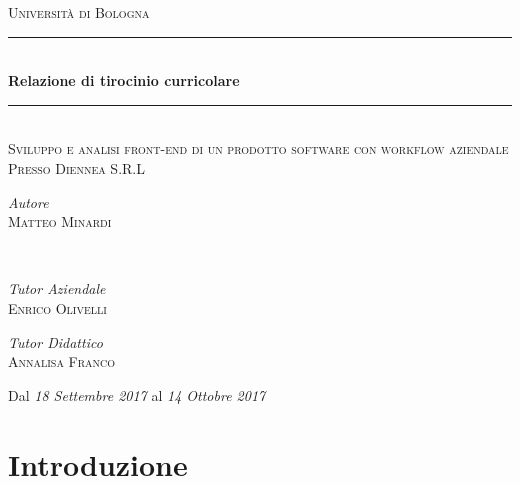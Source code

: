 \documentclass[a4paper]{article}
\begin{document}
\begin{titlepage}
	\newcommand{\HRule}{\rule{\linewidth}{0.1 mm}}
	\center
	\textsc{\LARGE Università di Bologna}\\[1.5cm] %
	
	\HRule\\[0.8 cm]
	{\huge\bfseries Relazione di tirocinio curricolare}\\[0.4cm] %
  \HRule\\[1.5cm]
  
	\textsc{\Large Sviluppo e analisi front-end di un prodotto software con workflow
	aziendale}\\[0.3cm] %
	\textsc{\large Presso Diennea S.R.L}\\[1.5cm] %
	
	
	\begin{minipage}{0.4\textwidth}
		\begin{flushleft}
			\large
			\textit{Autore}\\
			\textsc{Matteo Minardi}
		\end{flushleft}
	\end{minipage}
	~
	\begin{minipage}{0.4\textwidth}
		\begin{flushright}
			\large
			\textit{Tutor Aziendale}\\
			\textsc{Enrico Olivelli} %
    \end{flushright}
    \begin{flushright}
			\large
			\textit{Tutor Didattico}\\
			\textsc{Annalisa Franco} %
		\end{flushright}
	\end{minipage}
	

	\vfill\vfill\vfill %
  
  {\large Dal \emph{18 Settembre 2017} al \emph{14 Ottobre 2017}}\\[1 cm] %
	
\end{titlepage}

\section{Introduzione}
\label{sec:Introduzione}
\end{document}

